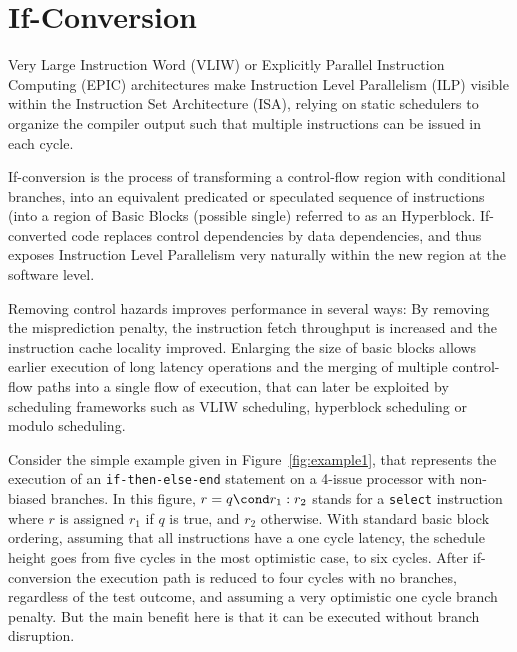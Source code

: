 \chapter{If-Conversion }
\label{chapter:if_conversion}

\newcommand{\annotation}[1]{%
  \marginpar{\small\itshape\color{red}#1}}




 Very Large Instruction Word (VLIW) or Explicitly Parallel Instruction Computing (EPIC) architectures make Instruction Level Parallelism (ILP) visible within the Instruction Set Architecture (ISA), relying on static schedulers to organize the compiler output such that multiple instructions can be issued in each cycle.

If-conversion is the process of transforming a control-flow region with conditional branches, into an equivalent predicated or speculated sequence of instructions (into a region of Basic Blocks (possible single) referred to as an Hyperblock. 
If-converted code replaces control dependencies by data dependencies, and thus exposes Instruction Level Parallelism very naturally within the new region at the software level.

Removing control hazards improves performance in several ways: 
By removing the misprediction penalty, the instruction fetch throughput is increased and the instruction cache locality improved. 
Enlarging the size of basic blocks allows earlier execution of long latency operations and the merging of multiple control-flow paths into a single flow of execution, that can later be exploited by scheduling frameworks such as VLIW scheduling, hyperblock scheduling or modulo scheduling.

Consider the simple example given in Figure~\ref{fig:example1}, that represents the execution of an \texttt{if-then-else-end} statement on a 4-issue processor with non-biased branches. 
In this figure, $r=q\cond r_1:r_2$ stands for a \texttt{select} instruction where $r$ is assigned $r_1$ if $q$ is true, and $r_2$ otherwise. 
With standard basic block ordering, assuming that all instructions have a one cycle latency, the schedule height goes from five cycles in the most optimistic case, to six cycles. 
After if-conversion the execution path is reduced to four cycles with no branches, regardless of the test outcome, and assuming a very optimistic one cycle branch penalty. 
But the main benefit here is that it can be executed without branch disruption.

